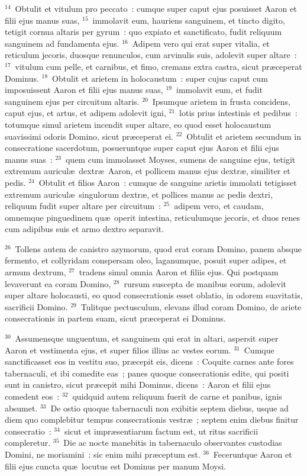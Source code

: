 ${}^{14}$~Obtulit et vitulum pro peccato~: cumque super caput ejus posuisset Aaron et filii ejus manus suas,
${}^{15}$~immolavit eum, hauriens sanguinem, et tincto digito, tetigit cornua altaris per gyrum~: quo expiato et sanctificato, fudit reliquum sanguinem ad fundamenta ejus.
${}^{16}$~Adipem vero qui erat super vitalia, et reticulum jecoris, duosque renunculos, cum arvinulis suis, adolevit super altare~:
${}^{17}$~vitulum cum pelle, et carnibus, et fimo, cremans extra castra, sicut pr\ae ceperat Dominus.
${}^{18}$~Obtulit et arietem in holocaustum~: super cujus caput cum imposuissent Aaron et filii ejus manus suas,
${}^{19}$~immolavit eum, et fudit sanguinem ejus per circuitum altaris.
${}^{20}$~Ipsumque arietem in frusta concidens, caput ejus, et artus, et adipem adolevit igni,
${}^{21}$~lotis prius intestinis et pedibus~: totumque simul arietem incendit super altare, eo quod esset holocaustum suavissimi odoris Domino, sicut pr\ae ceperat ei.
${}^{22}$~Obtulit et arietem secundum in consecratione sacerdotum, posueruntque super caput ejus Aaron et filii ejus manus suas~:
${}^{23}$~quem cum immolasset Moyses, sumens de sanguine ejus, tetigit extremum auricul\ae\ dextr\ae\ Aaron, et pollicem manus ejus dextr\ae , similiter et pedis.
${}^{24}$~Obtulit et filios Aaron~: cumque de sanguine arietis immolati tetigisset extremum auricul\ae\ singulorum dextr\ae , et pollices manus ac pedis dextri, reliquum fudit super altare per circuitum~:
${}^{25}$~adipem vero, et caudam, omnemque pinguedinem qu\ae\ operit intestina, reticulumque jecoris, et duos renes cum adipibus suis et armo dextro separavit.


${}^{26}$~Tollens autem de canistro azymorum, quod erat coram Domino, panem absque fermento, et collyridam conspersam oleo, laganumque, posuit super adipes, et armum dextrum,
${}^{27}$~tradens simul omnia Aaron et filiis ejus. Qui postquam levaverunt ea coram Domino,
${}^{28}$~rursum suscepta de manibus eorum, adolevit super altare holocausti, eo quod consecrationis esset oblatio, in odorem suavitatis, sacrificii Domino.
${}^{29}$~Tulitque pectusculum, elevans illud coram Domino, de ariete consecrationis in partem suam, sicut pr\ae ceperat ei Dominus.


${}^{30}$~Assumensque unguentum, et sanguinem qui erat in altari, aspersit super Aaron et vestimenta ejus, et super filios illius ac vestes eorum.
${}^{31}$~Cumque sanctificasset eos in vestitu suo, pr\ae cepit eis, dicens~: Coquite carnes ante fores tabernaculi, et ibi comedite eas~; panes quoque consecrationis edite, qui positi sunt in canistro, sicut pr\ae cepit mihi Dominus, dicens~: Aaron et filii ejus comedent eos~:
${}^{32}$~quidquid autem reliquum fuerit de carne et panibus, ignis absumet.
${}^{33}$~De ostio quoque tabernaculi non exibitis septem diebus, usque ad diem quo complebitur tempus consecrationis vestr\ae~; septem enim diebus finitur consecratio~:
${}^{34}$~sicut et impr\ae sentiarum factum est, ut ritus sacrificii compleretur.
${}^{35}$~Die ac nocte manebitis in tabernaculo observantes custodias Domini, ne moriamini~: sic enim mihi pr\ae ceptum est.
${}^{36}$~Feceruntque Aaron et filii ejus cuncta qu\ae\ locutus est Dominus per manum Moysi.

